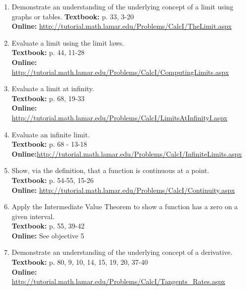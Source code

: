 \documentclass[12pt,landscape]{article}
\begin{document}

\begin{multicols}{2}
\begin{enumerate}
\item Demonstrate an understanding of the underlying concept of a limit using graphs or tables.
\textbf{Textbook:} p. 33, 3-20\\
\textbf{Online:} \url{http://tutorial.math.lamar.edu/Problems/CalcI/TheLimit.aspx}
\item Evaluate a limit using the limit laws.\\
\textbf{Textbook:} p. 44, 11-28\\
\textbf{Online:} \url{http://tutorial.math.lamar.edu/Problems/CalcI/ComputingLimits.aspx}
\item Evaluate a limit at infinity.\\
\textbf{Textbook:} p. 68, 19-33\\
\textbf{Online:} \url{http://tutorial.math.lamar.edu/Problems/CalcI/LimitsAtInfinityI.aspx}
\url{}
\item Evaluate an infinite limit.\\
\textbf{Textbook:} p. 68 - 13-18\\
\textbf{Online:}\url{http://tutorial.math.lamar.edu/Problems/CalcI/InfiniteLimits.aspx}
\item Show, via the definition, that a function is continuous at a point.\\
\textbf{Textbook:} p. 54-55, 15-26\\
\textbf{Online:} \url{http://tutorial.math.lamar.edu/Problems/CalcI/Continuity.aspx}
\item Apply the Intermediate Value Theorem to show a function has a zero on a given interval.\\
\textbf{Textbook:} p. 55, 39-42\\
\textbf{Online:} See objective 5
\vspace{1in}
\item Demonstrate an understanding of the underlying concept of a derivative.\\
\textbf{Textbook:} p. 80, 9, 10, 14, 15, 19, 20, 37-40\\
\textbf{Online:} \url{http://tutorial.math.lamar.edu/Problems/CalcI/Tangents_Rates.aspx}\\

\end{enumerate}
\end{multicols}
\end{document}
